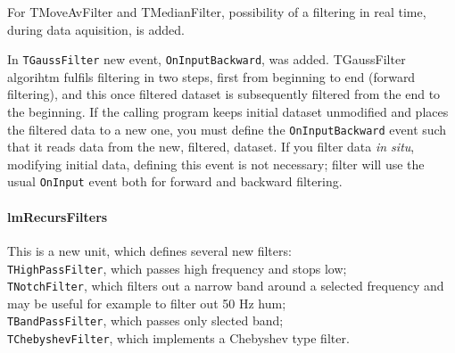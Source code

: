 \documentclass[12pt,a4paper,oneside]{report}
\newcommand{\code}[1]{\texttt{#1}}
\begin{document}
For TMoveAvFilter and TMedianFilter, possibility of a filtering in real time, during data aquisition, is added.

In \code{TGaussFilter} new event, \code{OnInputBackward}, was added.
TGaussFilter algorihtm fulfils filtering in two steps, first from beginning to end (forward filtering), and this once filtered dataset is subsequently filtered from the end to the beginning. If the calling program keeps initial dataset unmodified and places the filtered data to a new one, you must define the \code{OnInputBackward} event such that it reads data from the new, filtered, dataset. If you filter data \textit{in situ}, modifying initial data, defining this event is not necessary; filter will use the usual \code{OnInput} event both for forward and backward filtering.
\paragraph{lmRecursFilters}
This is a new unit, which defines several new filters:\\ \code{THighPassFilter}, which passes high frequency and stops low;\\ \code{TNotchFilter}, which filters out a narrow band around a selected frequency and may be useful for example to filter out 50 Hz hum;\\ \code{TBandPassFilter}, which passes only slected band; \\ \code{TChebyshevFilter}, which implements a Chebyshev type filter. 
\end{document}
